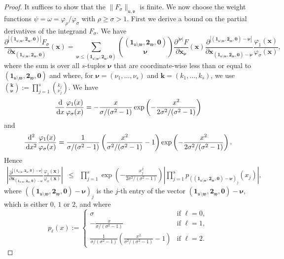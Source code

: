 \documentclass[namedate,webpdf,imanum]{ima-authoring-arxiv}%
\theoremstyle{thmstyletwo}%
\numberwithin{equation}{section}
\newcommand{\rd}{\, {\rm d}}
\newcommand{\bsx}{\boldsymbol{x}}
\newcommand{\bsk}{\boldsymbol{k}}
\newcommand{\bsnu}{\boldsymbol{\nu}}
\newcommand{\bszero}{\boldsymbol{0}}
\newcommand{\bsone}{\boldsymbol{1}}
\newcommand{\bstwo}{\boldsymbol{2}}
\newcommand{\uu}{\mathfrak{u}}
\newcommand{\vv}{\mathfrak{v}}
\newcommand{\ww}{\mathfrak{w}}
\begin{document}
\begin{proof}
It suffices to show that the $\|F_\sigma\|_{\uu,\vv}$ is finite. We now choose the weight functions $\psi=\omega = \varphi_\rho / \varphi_\sigma$ with $\rho \ge \sigma > 1$. First we derive  a bound on the partial derivatives of the integrand $F_\sigma$. We have
$$\frac{\partial^{|(\bsone_{\uu \setminus \ww},\bstwo_{\ww},\bszero)|}F_{\sigma}}{\partial \bsx_{(\bsone_{\uu \setminus \ww},\bstwo_{\ww},\bszero)}} (\bsx) = \sum_{\bsnu \le (\bsone_{\uu \setminus \ww},\bstwo_{\ww},\bszero)} {(\bsone_{\uu \setminus \ww},\bstwo_{\ww},\bszero) \choose \bsnu} \frac{\partial^{|\bsnu|}F}{\partial \bsx_{\bsnu}}(\bsx) \frac{\partial^{|(\bsone_{\uu \setminus \ww},\bstwo_{\ww},\bszero) -\bsnu|}}{\partial \bsx_{(\bsone_{\uu \setminus \ww},\bstwo_{\ww},\bszero)-\bsnu}} \frac{\varphi_1(\bsx)}{\varphi_{\sigma}(\bsx)},$$
where the sum is over all $s$-tuples $\bsnu$ that are coordinate-wise less than or equal to $(\bsone_{\uu \setminus \ww},\bstwo_{\ww},\bszero)$ and where, for $\bsnu=(\nu_1,\ldots,\nu_s)$ and $\bsk=(k_1,\ldots,k_s)$, we use ${\bsk \choose \bsnu}:=\prod_{j=1}^s {k_j \choose \nu_j}$. We have $$\frac{\rd}{\rd x} \frac{\varphi_1(x)}{\varphi_{\sigma}(x)}=-\frac{x}{\sigma/(\sigma^2-1)} \exp\left(-\frac{x^2}{2 \sigma^2/(\sigma^2-1)}\right)$$ 
and 
$$\frac{\rd^2}{\rd x^2} \frac{\varphi_1(x)}{\varphi_{\sigma}(x)}=\frac{1}{\sigma/(\sigma^2-1)} \left(\frac{x^2}{\sigma^2/(\sigma^2-1)}-1\right) \exp\left(-\frac{x^2}{2 \sigma^2/(\sigma^2-1)}\right).$$ Hence
\begin{eqnarray*}
\left|\frac{\partial^{|(\bsone_{\uu \setminus \ww},\bstwo_{\ww},\bszero) -\bsnu|}}{\partial \bsx_{(\bsone_{\uu \setminus \ww},\bstwo_{\ww},\bszero)-\bsnu}} \frac{\varphi_1(\bsx)}{\varphi_{\sigma}(\bsx)}\right| & \le & \prod_{j = 1}^s \exp\left(-\frac{x_j^2}{2 \sigma^2/(\sigma^2-1)}\right) \left| \prod_{j=1}^s p_{((\bsone_{\uu \setminus \ww},\bstwo_{\ww},\bszero) -\bsnu)_j}(x_j)\right|,
\end{eqnarray*}
where $((\bsone_{\uu \setminus \ww},\bstwo_{\ww},\bszero) -\bsnu)_j$ is the $j$-th entry of the vector $(\bsone_{\uu \setminus \ww},\bstwo_{\ww},\bszero) -\bsnu$, which is either $0$, $1$ or $2$, and where
$$p_{\ell}(x) := \left\{ 
\begin{array}{ll}
\sigma & \mbox{if } \ell=0,\\
-\frac{x}{\sigma/(\sigma^2-1)} & \mbox{if } \ell=1,\\
\frac{1}{\sigma/(\sigma^2-1)} \left(\frac{x^2}{\sigma^2/(\sigma^2-1)}-1\right) & \mbox{if } \ell=2.
\end{array}\right. $$

\end{proof}
\end{document}
